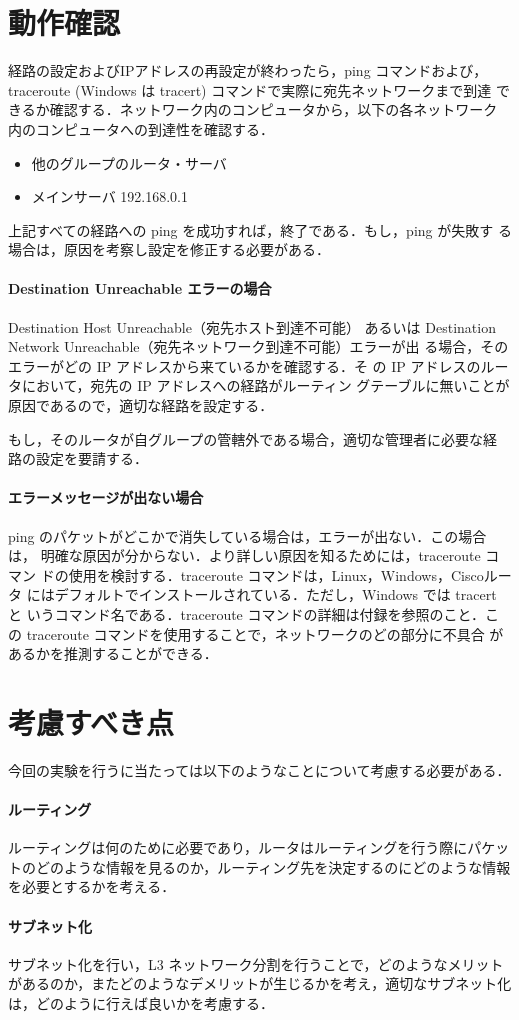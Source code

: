 \section{動作確認}
経路の設定およびIPアドレスの再設定が終わったら，ping コマンドおよび，
traceroute (Windows は tracert) コマンドで実際に宛先ネットワークまで到達
できるか確認する．ネットワーク内のコンピュータから，以下の各ネットワーク
内のコンピュータへの到達性を確認する．

\begin{itemize}
  \item 他のグループのルータ・サーバ
  \item メインサーバ 192.168.0.1
\end{itemize}

上記すべての経路への ping を成功すれば，終了である．もし，ping が失敗す
る場合は，原因を考察し設定を修正する必要がある．

\paragraph{Destination Unreachable エラーの場合}

Destination Host Unreachable（宛先ホスト到達不可能） あるいは
Destination Network Unreachable（宛先ネットワーク到達不可能）エラーが出
る場合，そのエラーがどの IP アドレスから来ているかを確認する．そ
の IP アドレスのルータにおいて，宛先の IP アドレスへの経路がルーティン
グテーブルに無いことが原因であるので，適切な経路を設定する．

もし，そのルータが自グループの管轄外である場合，適切な管理者に必要な経
路の設定を要請する．

\paragraph{エラーメッセージが出ない場合}

ping のパケットがどこかで消失している場合は，エラーが出ない．この場合は，
明確な原因が分からない．より詳しい原因を知るためには，traceroute コマン
ドの使用を検討する．traceroute コマンドは，Linux，Windows，Ciscoルータ
にはデフォルトでインストールされている．ただし，Windows では tracert と
いうコマンド名である．traceroute コマンドの詳細は付録を参照のこと．こ
の traceroute コマンドを使用することで，ネットワークのどの部分に不具合
があるかを推測することができる．

\section{考慮すべき点}
今回の実験を行うに当たっては以下のようなことについて考慮する必要がある．
\paragraph{ルーティング}
ルーティングは何のために必要であり，ルータはルーティングを行う際にパケッ
トのどのような情報を見るのか，ルーティング先を決定するのにどのような情報
を必要とするかを考える．

\paragraph{サブネット化}
サブネット化を行い，L3 ネットワーク分割を行うことで，どのようなメリット
があるのか，またどのようなデメリットが生じるかを考え，適切なサブネット化
は，どのように行えば良いかを考慮する．